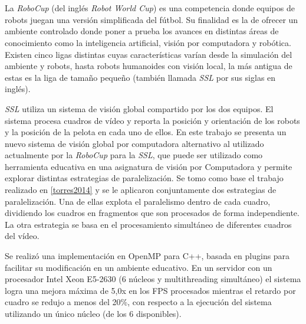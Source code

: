 \ \\
\ \\
\label{pagresum}
\\
\ \\
\ \\

\ \\

\ \\

La \emph{RoboCup} (del inglés \emph{Robot World Cup}) es una competencia donde
equipos de robots juegan una versión simplificada del fútbol. Su finalidad es
la de ofrecer un ambiente controlado donde poner a prueba los avances en
distintas áreas de conocimiento como la inteligencia artificial, visión por
computadora y robótica. Existen cinco ligas distintas cuyas características
varían desde la simulación del ambiente y robots, hasta robots humanoides con
visión local, la más antigua de estas es la liga de tamaño pequeño (también
llamada \emph{SSL} por sus siglas en inglés).

\emph{SSL} utiliza un sistema de visión global compartido por los dos equipos.
El sistema procesa cuadros de vídeo y reporta la posición y orientación de los
robots y la posición de la pelota en cada uno de ellos. En este trabajo se
presenta un nuevo sistema de visión global por computadora alternativo al
utilizado actualmente por la \emph{RoboCup} para la \emph{SSL}, que puede ser
utilizado como herramienta educativa en una asignatura de visión por Computadora
y permite explorar distintas estrategias de paralelización. Se tomo como base el
trabajo realizado en \ref{torres2014} y se le aplicaron conjuntamente dos
estrategias de paralelización. Una de ellas explota el paralelismo dentro de
cada cuadro, dividiendo los cuadros en fragmentos que son procesados de forma
independiente. La otra estrategia se basa en el procesamiento simultáneo de
diferentes cuadros del vídeo.

Se realizó una implementación en OpenMP para C++, basada en plugins para
facilitar su modificación en un ambiente educativo. En un servidor con un
procesador Intel Xeon E5-2630 (6 núcleos y multithreading simultáneo) el
sistema logra una mejora máxima de 5,0x en los FPS procesados mientras el
retardo por cuadro se redujo a menos del 20\%, con respecto a la ejecución del
sistema utilizando un único núcleo (de los 6 disponibles).

\vfill
\pagebreak
